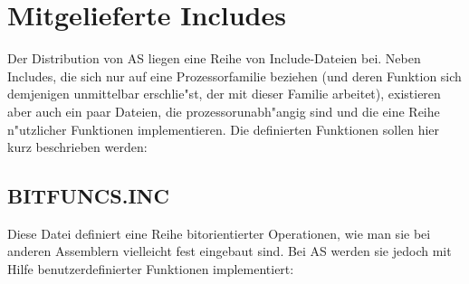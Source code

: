 \documentclass[12pt,a4paper,twoside]{report}
\begin{document}

\cleardoublepage
\chapter{Mitgelieferte Includes}

Der Distribution von AS liegen eine Reihe von Include-Dateien bei.  Neben
Includes, die sich nur auf eine Prozessorfamilie beziehen (und deren
Funktion sich demjenigen unmittelbar erschlie"st, der mit dieser Familie
arbeitet), existieren aber auch ein paar Dateien, die prozessorunabh"angig
sind und die eine Reihe n"utzlicher Funktionen implementieren.  Die
definierten Funktionen sollen hier kurz beschrieben werden:

\section{BITFUNCS.INC}

Diese Datei definiert eine Reihe bitorientierter Operationen, wie man sie
bei anderen Assemblern vielleicht fest eingebaut sind.  Bei AS werden sie
jedoch mit Hilfe benutzerdefinierter Funktionen implementiert:
\end{document}
